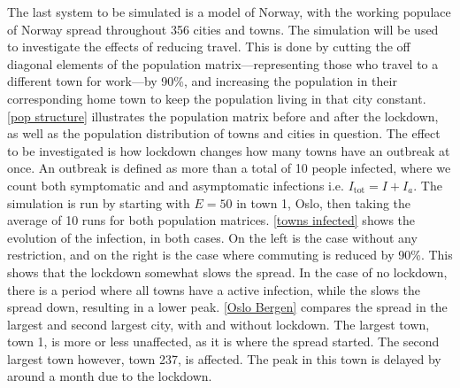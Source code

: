 \documentclass{article}
\begin{document}
    The last system to be simulated is a model of Norway, with the working populace of Norway spread throughout 356 cities and towns. 
    The simulation will be used to investigate the effects of reducing travel.
    This is done by cutting the off diagonal elements of the population matrix---representing those who travel to a different town for work---by 90\%, and increasing the population in their corresponding home town to keep the population living in that city constant.
    \autoref{pop structure} illustrates the population matrix before and after the lockdown, as well as the population distribution of towns and cities in question.
    The effect to be investigated is how lockdown changes how many towns have an outbreak at once.
    An outbreak is defined as more than a total of 10 people infected, where we count both symptomatic and and asymptomatic infections i.e. $I_\mathrm{tot}=I + I_a$.
    The simulation is run by starting with $E=50$ in town 1, Oslo, then taking the average of 10 runs for both population matrices.
    \autoref{towns infected} shows the evolution of the infection, in both cases. 
    On the left is the case without any restriction, and on the right is the case where commuting is reduced by 90\%. 
    This shows that the lockdown somewhat slows the spread.
    In the case of no lockdown, there is a period where all towns have a active infection, while the slows the spread down, resulting in a lower peak.
    \autoref{Oslo Bergen} compares the spread in the largest and second largest city, with and without lockdown.
    The largest town, town 1, is more or less unaffected, as it is where the spread started.
    The second largest town however, town 237, is affected.
    The peak in this town is delayed by around a month due to the lockdown.
\end{document}
